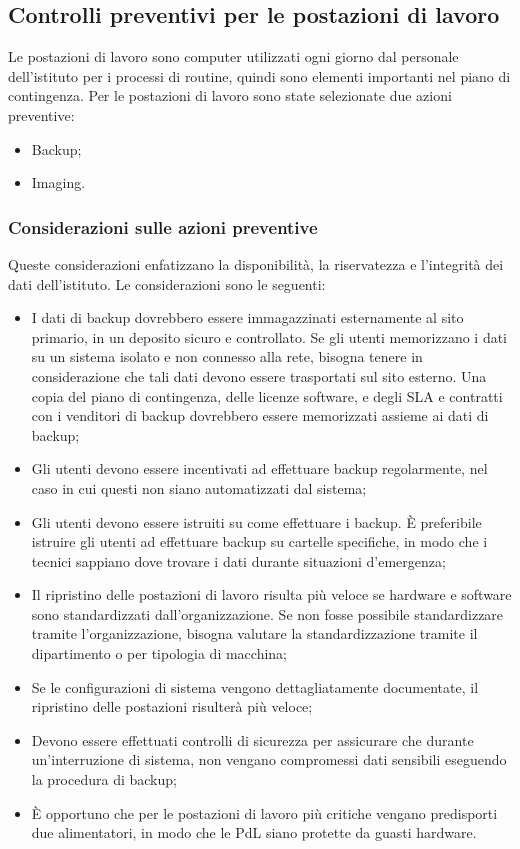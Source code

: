 \documentclass[12pt, a4paper, titlepage]{report}
\begin{document}
	\newpage
	
	\subsection{Controlli preventivi per le postazioni di lavoro} \label{postazioni}
	
	Le postazioni di lavoro sono computer utilizzati ogni giorno dal personale dell'istituto per i processi di routine, quindi sono elementi importanti nel piano di contingenza. Per le postazioni di lavoro sono state selezionate due azioni preventive:
	\begin{itemize}
		\item Backup;
		\item Imaging.
	\end{itemize}
	
	\subsubsection{Considerazioni sulle azioni preventive}
	
	Queste considerazioni enfatizzano la disponibilità, la riservatezza e l'integrità dei dati dell'istituto. Le considerazioni sono le seguenti:
	\begin{itemize}
		\item I dati di backup dovrebbero essere immagazzinati esternamente al sito primario, in un deposito sicuro e controllato. Se gli utenti memorizzano i dati su un sistema isolato e non connesso alla rete, bisogna tenere in considerazione che tali dati devono essere trasportati sul sito esterno. Una copia del piano di contingenza, delle licenze software, e degli SLA e contratti con i venditori di backup dovrebbero essere memorizzati assieme ai dati di backup;
		\item Gli utenti devono essere incentivati ad effettuare backup regolarmente, nel caso in cui questi non siano automatizzati dal sistema;
		\item Gli utenti devono essere istruiti su come effettuare i backup. È preferibile istruire gli utenti ad effettuare backup su cartelle specifiche, in modo che i tecnici sappiano dove trovare i dati durante situazioni d'emergenza;
		\item Il ripristino delle postazioni di lavoro risulta più veloce se hardware e software sono standardizzati dall'organizzazione. Se non fosse possibile standardizzare tramite l'organizzazione, bisogna valutare la standardizzazione tramite il dipartimento o per tipologia di macchina;
		\item Se le configurazioni di sistema vengono dettagliatamente documentate, il ripristino delle postazioni risulterà più veloce;
		\item Devono essere effettuati controlli di sicurezza per assicurare che durante un'interruzione di sistema, non vengano compromessi dati sensibili eseguendo la procedura di backup;
		\item È opportuno che per le postazioni di lavoro più critiche vengano predisporti due alimentatori, in modo che le PdL siano protette da guasti hardware.
	\end{itemize}
	
\end{document}

